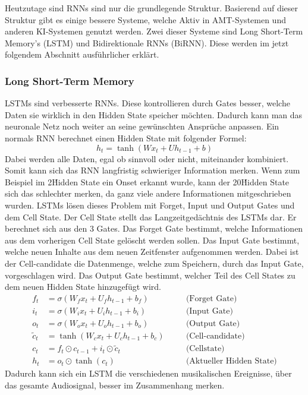 Heutzutage sind RNNs sind nur die grundlegende Struktur.
Basierend auf dieser Struktur gibt es einige bessere Systeme,
welche Aktiv in AMT-Systemen und anderen KI-Systemen genutzt werden.
Zwei dieser Systeme sind Long Short-Term Memory's (LSTM) und Bidirektionale RNNs (BiRNN).
Diese werden im jetzt folgendem Abschnitt ausführlicher erklärt.

\subsubsection{Long Short-Term Memory}
LSTMs sind verbesserte RNNs.
Diese kontrollieren durch Gates besser, welche Daten sie wirklich in den Hidden State speicher möchten.
Dadurch kann man das neuronale Netz noch weiter an seine gewünschten Ansprüche anpassen.
Ein normals RNN berechnet einen Hidden State mit folgender Formel:
\begin{equation*}
h_t = \tanh(W x_t + U h_{t-1} + b)
\end{equation*}
Dabei werden alle Daten, egal ob sinnvoll oder nicht, miteinander kombiniert.
Somit kann sich das RNN langfristig schwieriger Information merken.
Wenn zum Beispiel im 2\. Hidden State ein Onset erkannt wurde, kann der 20\. Hidden State
sich das schlechter merken, da ganz viele andere Informationen mitgeschrieben wurden.
LSTMs lösen dieses Problem mit Forget, Input und Output Gates und dem Cell State.
Der Cell State stellt das Langzeitgedächtnis des LSTMs dar.
Er berechnet sich aus den 3 Gates.
Das Forget Gate bestimmt, welche Informationen aus dem vorherigen Cell State gelöscht werden sollen.
Das Input Gate bestimmt, welche neuen Inhalte aus dem neuen Zeitfenster aufgenommen werden.
Dabei ist der Cell-candidate die Datenmenge, welche zum Speichern, durch das Input Gate, vorgeschlagen wird.
Das Output Gate bestimmt, welcher Teil des Cell States zu dem neuen Hidden State hinzugefügt wird.
\begin{align*}
f_t &= \sigma(W_f x_t + U_f h_{t-1} + b_f) \quad &&\text{(Forget Gate)} \\
i_t &= \sigma(W_i x_t + U_i h_{t-1} + b_i) \quad &&\text{(Input Gate)} \\
o_t &= \sigma(W_o x_t + U_o h_{t-1} + b_o) \quad &&\text{(Output Gate)} \\
\tilde{c}_t &= \tanh(W_c x_t + U_c h_{t-1} + b_c) \quad &&\text{(Cell-candidate)} \\
c_t &= f_t \odot c_{t-1} + i_t \odot \tilde{c}_t \quad &&\text{(Cellstate)} \\
h_t &= o_t \odot \tanh(c_t) \quad &&\text{(Aktueller Hidden State)}
\end{align*}
Dadurch kann sich ein LSTM die verschiedenen musikalischen Ereignisse,
über das gesamte Audiosignal, besser im Zusammenhang merken.


